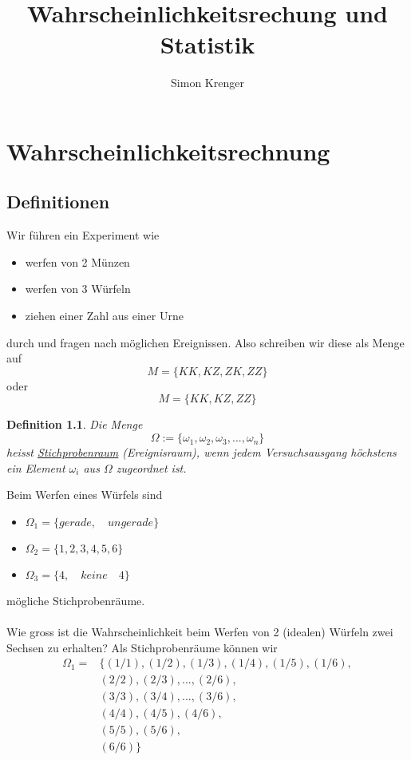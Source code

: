\documentclass{report}
\title{Wahrscheinlichkeitsrechung und Statistik}
\author{Simon Krenger}
\newtheorem{mydef}{Definition}
\begin{document}
\maketitle
\tableofcontents
\chapter{Wahrscheinlichkeitsrechnung}
\section{Definitionen}
Wir führen ein Experiment wie
\begin{itemize}
\item werfen von 2 Münzen
\item werfen von 3 Würfeln
\item ziehen einer Zahl aus einer Urne
\end{itemize}
durch und fragen nach möglichen Ereignissen. Also schreiben wir diese als Menge auf
\begin{equation}
M = \{ KK, KZ, ZK, ZZ \}
\end{equation}
oder
\begin{equation}
M = \{ KK, KZ, ZZ \}
\end{equation}
\begin{mydef}
Die Menge
\begin{equation}
\Omega := \{ \omega_1, \omega_2, \omega_3, ..., \omega_n \}
\end{equation}
heisst \underline{Stichprobenraum} (Ereignisraum), wenn jedem Versuchsausgang höchstens ein Element $\omega_i$ aus $\Omega$ zugeordnet ist.
\end{mydef}
Beim Werfen eines Würfels sind
\begin{itemize}
\item $\Omega_1 = \{ gerade, \quad ungerade \}$
\item $\Omega_2 = \{ 1,2,3,4,5,6 \}$
\item $\Omega_3 = \{ 4, \quad keine \quad 4 \}$
\end{itemize}
mögliche Stichprobenräume.\\\\
Wie gross ist die Wahrscheinlichkeit beim Werfen von 2 (idealen) Würfeln zwei Sechsen zu erhalten?
Als Stichprobenräume können wir
\begin{align*}
 \Omega_1 =& \{ (1/1), (1/2), (1/3), (1/4), (1/5), (1/6), \\
 \quad & (2/2), (2/3), ..., (2/6), \\
 \quad & (3/3), (3/4), ..., (3/6), \\
 \quad & (4/4), (4/5), (4/6), \\
 \quad & (5/5), (5/6), \\
 \quad & (6/6) \}
\end{align*}
\end{document}
